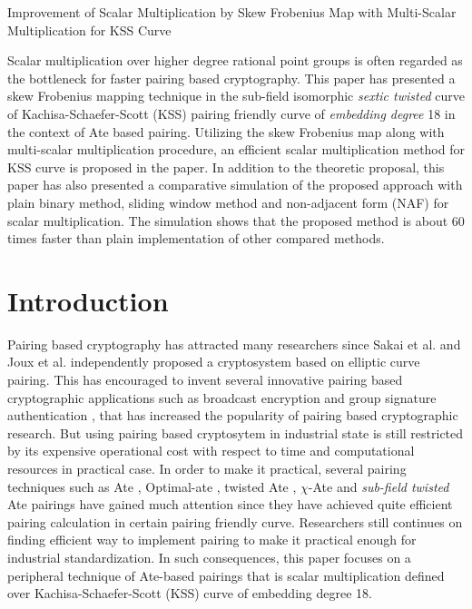 Improvement of Scalar Multiplication by Skew Frobenius Map with Multi-Scalar Multiplication for KSS Curve

Scalar multiplication over higher degree rational point groups is often regarded as the bottleneck for faster pairing based cryptography.
This paper has presented a skew Frobenius mapping technique in the sub-field isomorphic \textit{sextic twisted} curve of  Kachisa-Schaefer-Scott (KSS)  pairing friendly curve of \textit{embedding degree} 18  in the context of Ate based pairing. 
Utilizing the skew Frobenius map along with multi-scalar multiplication procedure, an efficient scalar multiplication method for KSS curve is proposed in the paper.
In addition to the theoretic proposal, this paper has also presented a comparative simulation of the proposed approach with plain binary method, sliding window method and non-adjacent form (NAF) for scalar multiplication. The simulation shows that the proposed method is about 60 times faster than plain implementation of other compared methods.
\section{Introduction}

Pairing based cryptography has attracted many researchers since Sakai et al. \cite{sakai} and Joux et al. \cite{joux} independently proposed a cryptosystem based on elliptic curve pairing. This has encouraged to invent several innovative pairing based cryptographic applications such as broadcast encryption \cite{boradcast} and group signature authentication \cite{group_sign_1}, that has increased the popularity of pairing based cryptographic research.
But using pairing based cryptosytem in industrial state is still restricted by its expensive operational cost with respect to time and computational resources in practical case. 
In order to make it practical, several pairing techniques such as Ate \cite{ate}, Optimal-ate \cite{op_ate_p}, twisted Ate \cite{twisted_ate}, $\chi$-Ate \cite{chibasedBN} and \textit{sub-field twisted} Ate \cite{devegili} pairings have gained much attention since they have achieved quite efficient pairing calculation in certain pairing friendly curve. 
Researchers still continues on finding efficient way to implement pairing to make it practical enough for industrial standardization. 
In such consequences, this paper focuses on a peripheral technique of Ate-based pairings  that is scalar multiplication defined over Kachisa-Schaefer-Scott (KSS) curve \cite{kss} of embedding degree 18. 

